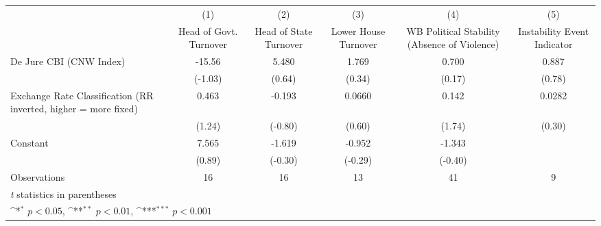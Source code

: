 {
\def\sym#1{\ifmmode^{#1}\else\(^{#1}\)\fi}
\begin{tabular}{l*{5}{c}}
\hline\hline
                &\multicolumn{1}{c}{(1)}&\multicolumn{1}{c}{(2)}&\multicolumn{1}{c}{(3)}&\multicolumn{1}{c}{(4)}&\multicolumn{1}{c}{(5)}\\
                &\multicolumn{1}{c}{Head of Govt. Turnover}&\multicolumn{1}{c}{Head of State Turnover}&\multicolumn{1}{c}{Lower House Turnover}&\multicolumn{1}{c}{WB Political Stability (Absence of Violence)}&\multicolumn{1}{c}{Instability Event Indicator}\\
\hline
De Jure CBI (CNW Index)&   -15.56         &    5.480         &    1.769         &    0.700         &    0.887         \\
                &  (-1.03)         &   (0.64)         &   (0.34)         &   (0.17)         &   (0.78)         \\
[1em]
Exchange Rate Classification (RR inverted, higher = more fixed)&    0.463         &   -0.193         &   0.0660         &    0.142         &   0.0282         \\
                &   (1.24)         &  (-0.80)         &   (0.60)         &   (1.74)         &   (0.30)         \\
[1em]
Constant        &    7.565         &   -1.619         &   -0.952         &   -1.343         &                  \\
                &   (0.89)         &  (-0.30)         &  (-0.29)         &  (-0.40)         &                  \\
\hline
Observations    &       16         &       16         &       13         &       41         &        9         \\
\hline\hline
\multicolumn{6}{l}{\footnotesize \textit{t} statistics in parentheses}\\
\multicolumn{6}{l}{\footnotesize \sym{*} \(p<0.05\), \sym{**} \(p<0.01\), \sym{***} \(p<0.001\)}\\
\end{tabular}
}
